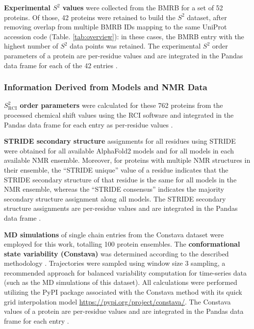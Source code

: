 \textbf{Experimental $S^2$ values} were collected from the BMRB for a set of 52 proteins. Of those, 42 proteins were retained to build the $S^2$ dataset, after removing overlap from multiple BMRB IDs mapping to the same UniProt accession code (Table. \ref{tab:overview}):  in these cases, the BMRB entry with the highest number of $S^2$ data points was retained. The experimental $S^2$ order parameters of a protein are per-residue values and are integrated in the Pandas data frame for each of the 42 entries \cite{mckinney-proc-scipy-2010, reback2020pandas}.

\subsubsection{Information Derived from Models and NMR Data
\label{sec:rmsf}}

\textbf{$S^{2}_{\text{RCI}}$ order parameters} were calculated for these 762 proteins from the processed chemical shift values using the RCI software \cite{berjanskii_application_2008} and integrated in the Pandas data frame for each entry as per-residue values \cite{mckinney-proc-scipy-2010, reback2020pandas}.

\textbf{STRIDE secondary structure} assignments for all residues using STRIDE \cite{frishman_knowledge-based_1995, lovell_structure_2003} were obtained for all available AlphaFold2 models and for all models in each available NMR ensemble. Moreover, for proteins with multiple NMR structures in their ensemble, the ``STRIDE unique'' value of a residue indicates that the STRIDE secondary structure of that residue is the same for all models in the NMR ensemble, whereas the ``STRIDE consensus'' indicates the majority secondary structure assignment along all models. The STRIDE secondary structure assignments are per-residue values and are integrated in the Pandas data frame \cite{mckinney-proc-scipy-2010, reback2020pandas}.

\textbf{MD simulations} of single chain entries from the Constava dataset \cite{gavalda-garcia_data-driven_2024} were employed for this work, totalling 100 protein ensembles. The \textbf{conformational state variability (Constava)} was determined according to the described methodology  \cite{gavalda-garcia_data-driven_2024}. Trajectories were sampled using window size 3 sampling, a recommended approach for balanced variability computation for time-series data (such as the MD simulations of this dataset). All calculations were performed utilizing the PyPI package associated with the Constava method with its quick grid interpolation model \url{https://pypi.org/project/constava/}. The Constava values of a protein are per-residue values and are integrated in the Pandas data frame for each entry \cite{mckinney-proc-scipy-2010, reback2020pandas}.

